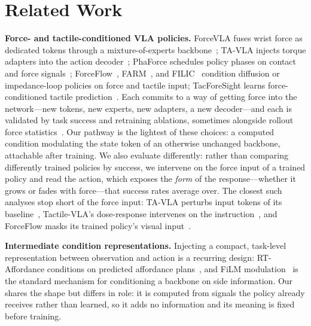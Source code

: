 \section{Related Work}
\label{sec:related}

\textbf{Force- and tactile-conditioned VLA policies.}
ForceVLA fuses wrist force as dedicated tokens through a mixture-of-experts
backbone~\cite{forcevla}; TA-VLA injects torque adapters into the action
decoder~\cite{tavla}; PhaForce schedules policy phases on contact and force
signals~\cite{phaforce}; ForceFlow~\cite{forceflow}, FARM~\cite{farm}, and
FILIC~\cite{filic} condition diffusion or impedance-loop policies on force and tactile
input; TacForeSight learns force-conditioned tactile prediction~\cite{tacforesight}.
Each commits to a way of getting force into the network---new tokens, new experts, new
adapters, a new decoder---and each is validated by task success and retraining ablations,
sometimes alongside rollout force statistics~\cite{phaforce,forceflow}. Our pathway is the
lightest of these choices: a computed condition modulating the state token of an otherwise
unchanged backbone, attachable after training. We also evaluate differently: rather than
comparing differently trained policies by success, we intervene on the force input of a
trained policy and read the action, which exposes the \emph{form} of the response---whether
it grows or fades with force---that success rates average over. The closest such analyses
stop short of the force input: TA-VLA perturbs input tokens of its baseline~\cite{tavla},
Tactile-VLA's dose-response intervenes on the instruction~\cite{tactilevla}, and ForceFlow
masks its trained policy's visual input~\cite{forceflow}.

\textbf{Intermediate condition representations.}
Injecting a compact, task-level representation between observation and action is a recurring
design: RT-Affordance conditions on predicted affordance plans~\cite{rtaffordance}, and FiLM
modulation~\cite{perez2018film} is the standard mechanism for conditioning a backbone on side
information. Our \chat{} shares the shape but differs in role: it is computed from signals the
policy already receives rather than learned, so it adds no information and its meaning is fixed
before training.

